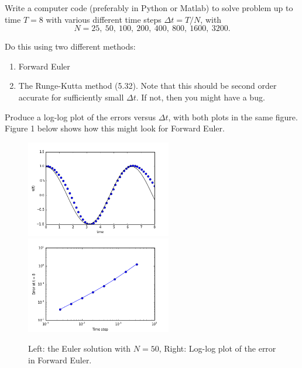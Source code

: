 \documentclass[10pt]{article}
\begin{document}
Write a computer code (preferably in Python or Matlab) to solve
problem  up to time $T=8$ with various different time
steps $\Delta t = T / N$, with
\[
N = 25,~ 50,~ 100,~ 200,~ 400,~ 800,~ 1600,~ 3200.
\]

Do this using two different methods:
\begin{enumerate} 
\item Forward Euler
\item The Runge-Kutta method (5.32).
Note that this should be second order accurate for sufficiently small
$\Delta t$.  If not, then you might have a bug.
\end{enumerate} 

Produce a log-log plot of the errors versus
$\Delta t$, with both plots in the same figure.   Figure 1 below shows how
this might look for Forward Euler. 


\begin{figure}[h]
\hfil\includegraphics[width=2.5in]{euler50.png}\hfil
\hfil\includegraphics[width=2.5in]{euler_errors.png}\hfil
\caption{\label{fig:plots1} 
Left: the Euler solution with $N=50$, Right: Log-log plot of the error in
Forward Euler.
  }
\end{figure}



\end{document}
